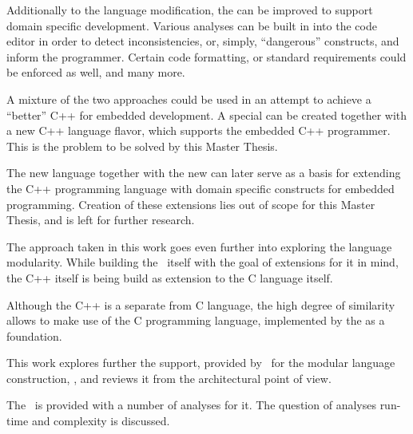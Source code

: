 Additionally to the language modification, the  can 
be improved to support domain specific development. Various analyses can be built in into the code 
editor in order to detect inconsistencies, or, simply, ``dangerous'' constructs, and inform the programmer.
Certain code formatting, or standard requirements could be enforced as well, and many more.

A mixture of the two approaches could be used in an attempt to achieve a ``better'' C++ for embedded development.
A special  can be created together with a new C++ language flavor, which supports the embedded C++ programmer.
This is the problem to be solved by this Master Thesis.

The new language together with the new  can later serve as a basis for extending the C++ programming 
language with domain specific constructs for embedded programming. Creation of these extensions lies out of scope
for this Master Thesis, and is left for further research.

The approach taken in this work goes even further into exploring the language modularity. While building the \cpppl\ itself 
with the goal of extensions for it in mind, the C++ itself is being build as extension to the C language itself.

Although the C++ is a separate from C language, the high degree of similarity allows to make use of the C programming language,
implemented by the  as a foundation.

This work explores further the support, provided by \jbmps\ for the modular language construction, \cite{2012_ratiu_modular_dsls_and_analyses},
and reviews it from the architectural point of view.

The \cpppl\ is provided with a number of analyses for it. The question of analyses run-time and complexity is discussed.

